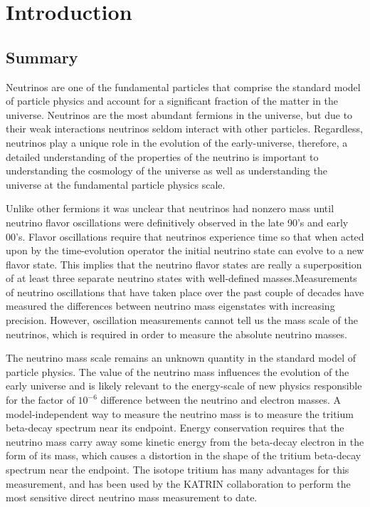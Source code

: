 
\chapter{Introduction} 
\label{chap:introduction}

\section{Summary}

Neutrinos are one of the fundamental particles that comprise the standard model of particle physics and account for a significant fraction of the matter in the universe. Neutrinos are the most abundant fermions in the universe, but due to their weak interactions neutrinos seldom interact with other particles. Regardless, neutrinos play a unique role in the evolution of the early-universe, therefore, a detailed understanding of the properties of the neutrino is important to understanding the cosmology of the universe as well as understanding the universe at the fundamental particle physics scale.

Unlike other fermions it was unclear that neutrinos had nonzero mass until neutrino flavor oscillations were definitively observed in the late 90's and early 00's. Flavor oscillations require that neutrinos experience time so that when acted upon by the time-evolution operator the initial neutrino state can evolve to a new flavor state. This implies that the neutrino flavor states are really a superposition of at least three separate neutrino states with well-defined masses.Measurements of neutrino oscillations that have taken place over the past couple of decades have measured the differences between neutrino mass eigenstates with increasing precision. However, oscillation measurements cannot tell us the mass scale of the neutrinos, which is required in order to measure the absolute neutrino masses.

The neutrino mass scale remains an unknown quantity in the standard model of particle physics. The value of the neutrino mass influences the evolution of the early universe and is likely relevant to the energy-scale of new physics responsible for the factor of $10^{-6}$ difference between the neutrino and electron masses. A model-independent way to measure the neutrino mass is to measure the tritium beta-decay spectrum near its endpoint. Energy conservation requires that the neutrino mass carry away some kinetic energy from the beta-decay electron in the form of its mass, which causes a distortion in the shape of the tritium beta-decay spectrum near the endpoint. The isotope tritium has many advantages for this measurement, and has been used by the KATRIN collaboration to perform the most sensitive direct neutrino mass measurement to date.


